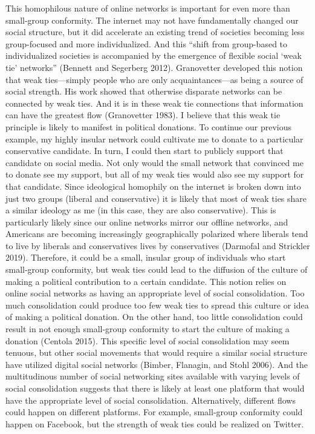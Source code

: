 \documentclass[12pt,]{article}
\begin{document}
This homophilous nature of online networks is important for even more
than small-group conformity. The internet may not have fundamentally
changed our social structure, but it did accelerate an existing trend of
societies becoming less group-focused and more individualized. And this
``shift from group-based to individualized societies is accompanied by
the emergence of flexible social `weak tie' networks'' (Bennett and
Segerberg 2012). Granovetter developed this notion that weak
ties---simply people who are only acquaintances---as being a source of
social strength. His work showed that otherwise disparate networks can
be connected by weak ties. And it is in these weak tie connections that
information can have the greatest flow (Granovetter 1983). I believe
that this weak tie principle is likely to manifest in political
donations. To continue our previous example, my highly insular network
could cultivate me to donate to a particular conservative candidate. In
turn, I could then start to publicly support that candidate on social
media. Not only would the small network that convinced me to donate see
my support, but all of my weak ties would also see my support for that
candidate. Since ideological homophily on the internet is broken down
into just two groups (liberal and conservative) it is likely that most
of weak ties share a similar ideology as me (in this case, they are also
conservative). This is particularly likely since our online networks
mirror our offline networks, and Americans are becoming increasingly
geographically polarized where liberals tend to live by liberals and
conservatives lives by conservatives (Darmofal and Strickler 2019).
Therefore, it could be a small, insular group of individuals who start
small-group conformity, but weak ties could lead to the diffusion of the
culture of making a political contribution to a certain candidate. This
notion relies on online social networks as having an appropriate level
of social consolidation. Too much consolidation could produce too few
weak ties to spread this culture or idea of making a political donation.
On the other hand, too little consolidation could result in not enough
small-group conformity to start the culture of making a donation
(Centola 2015). This specific level of social consolidation may seem
tenuous, but other social movements that would require a similar social
structure have utilized digital social networks (Bimber, Flanagin, and
Stohl 2006). And the multitudinous number of social networking sites
available with varying levels of social consolidation suggests that
there is likely at least one platform that would have the appropriate
level of social consolidation. Alternatively, different flows could
happen on different platforms. For example, small-group conformity could
happen on Facebook, but the strength of weak ties could be realized on
Twitter.
\end{document}
